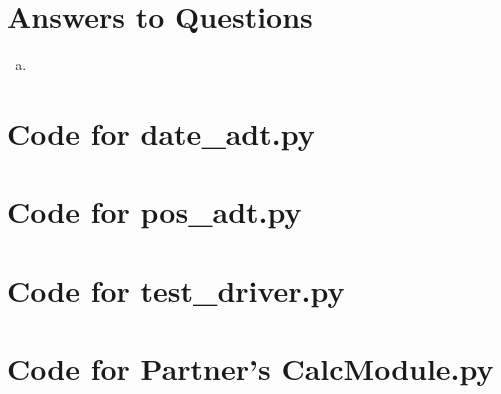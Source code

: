 \documentclass[12pt]{article}
\begin{document}
\section{Answers to Questions}

\begin{enumerate}[(a)]

\item 

\end{enumerate}

\newpage

\lstset{language=Python, basicstyle=\tiny, breaklines=true, showspaces=false,
  showstringspaces=false, breakatwhitespace=true}

\def\thesection{\Alph{section}}

\section{Code for date\_adt.py}

\noindent 

\newpage

\section{Code for pos\_adt.py}

\noindent 

\newpage

\section{Code for test\_driver.py}

\noindent 

\newpage

\section{Code for Partner's CalcModule.py}

\noindent 
\end{document}
